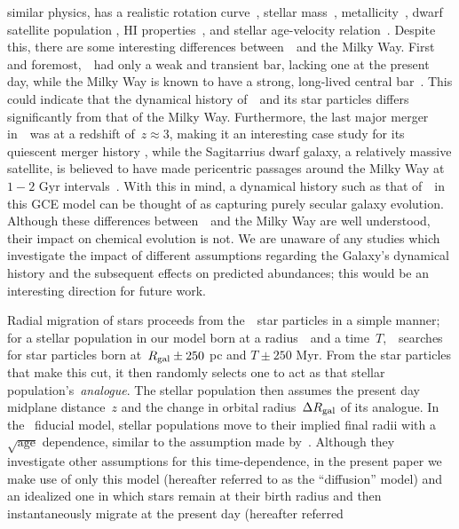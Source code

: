 \documentclass[ms.tex]{subfiles}
\begin{document}
similar physics, has a realistic rotation curve~\citep{Governato2012,
Christensen2014a, Christensen2014b}, stellar mass~\citep{Munshi2013},
metallicity~\citep{Christensen2016}, dwarf satellite population
\citep{Zolotov2012, Brooks2014}, HI properties~\citep{Brooks2017}, and stellar
age-velocity relation~\citep{Bird2021}.
Despite this, there are some interesting differences between~\hsim~and the
Milky Way.
First and foremost,~\hsim~had only a weak and transient bar, lacking one at the
present day, while the Milky Way is known to have a strong, long-lived central
bar~\citep[e.g.][]{Bovy2019}.
This could indicate that the dynamical history of~\hsim~and its star particles
differs significantly from that of the Milky Way.
Furthermore, the last major merger in~\hsim~was at a redshift of~$z \approx 3$,
making it an interesting case study for its quiescent merger history
\citep[e.g.][]{Zolotov2012}, while the Sagitarrius dwarf galaxy, a relatively
massive satellite, is believed to have made pericentric passages around the
Milky Way at~$1 - 2$ Gyr intervals~\citep{Law2010}.
With this in mind, a dynamical history such as that of~\hsim~in this GCE model
can be thought of as capturing purely secular galaxy evolution.
Although these differences between~\hsim~and the Milky Way are well understood,
their impact on chemical evolution is not.
We are unaware of any studies which investigate the impact of different
assumptions regarding the Galaxy's dynamical history and the subsequent effects
on predicted abundances; this would be an interesting direction for future work.
\par
Radial migration of stars proceeds from the~\hsim~star particles in a simple
manner; for a stellar population in our model born at a radius~\rgal~and a
time~$T$,~\vice~searches for star particles born at~$R_\text{gal} \pm 250$ pc and
$T \pm 250$ Myr.
From the star particles that make this cut, it then randomly selects one to act
as that stellar population's~\textit{analogue}.
The stellar population then assumes the present day midplane distance~$z$ and
the change in orbital radius~$\Delta R_\text{gal}$ of its analogue.
In the~\citet{Johnson2021} fiducial model, stellar populations move to their
implied final radii with a~$\sqrt{\text{age}}$ dependence, similar to the
assumption made by~\citet{Frankel2018, Frankel2019}.
Although they investigate other assumptions for this time-dependence, in the
present paper we make use of only this model (hereafter referred to as the
``diffusion'' model) and an idealized one in which stars remain at their birth
radius and then instantaneously migrate at the present day (hereafter referred
\end{document}
